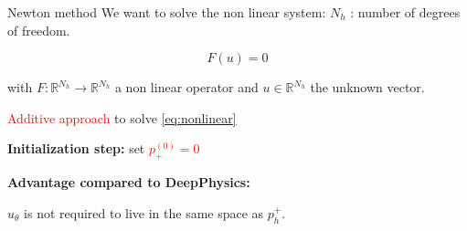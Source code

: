 \begin{frame}[noframenumbering]{Newton method}
    \vspace{5pt}
    We want to solve the non linear system: \hfill \tiny $N_h$ : number of degrees of freedom.

    \normalsize
    \vspace{-10pt}
    \begin{equation}
        F(u) = 0 \tag{1}
    \end{equation}

    \vspace{-2pt}
    with $F:\mathbb{R}^{N_h} \to \mathbb{R}^{N_h}$ a non linear operator and $u\in\mathbb{R}^{N_h}$ the unknown vector.

    \begin{center}
        \small
        \begin{minipage}{0.9\linewidth}
            \begin{algorithm}[H]
                \SetAlgoLined
                \caption{\textcolor{red}{Additive approach} to solve \eqref{eq:nonlinear} }
                \textbf{Initialization step:} set \textcolor{red}{$p_+^{(0)} = 0$}\;
            \end{algorithm}
        \end{minipage}
    \end{center}

    \textbf{Advantage compared to DeepPhysics:}

    \begin{center}
    $u_\theta$ is not required to live in the same space as $p_h^+$.
    \end{center}
\end{frame}

